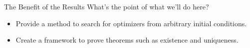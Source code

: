 \documentclass[usenames,dvipsnames]{beamer}
\theoremstyle{definition}
\theoremstyle{theorem}
\begin{document}
      \begin{frame}{The Benefit of the Results}
            What's the point of what we'll do here?
            \begin{itemize}
                \item Provide a method to search for optimizers from arbitrary initial conditions.
                \item Create a framework to prove theorems such as existence and uniqueness.
            \end{itemize}
        \end{frame}
    
        
\end{document}

